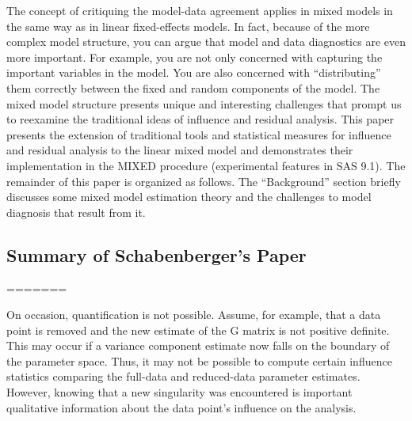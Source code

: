 \documentclass[12pt, a4paper]{article}
\begin{document}
The concept of critiquing the model-data agreement applies in mixed models in the same way as in linear
fixed-effects models. In fact, because of the more complex model structure, you can argue that model and
data diagnostics are even more important. For example, you are not only concerned with capturing the
important variables in the model. You are also concerned with “distributing” them correctly between the
fixed and random components of the model. The mixed model structure presents unique and interesting
challenges that prompt us to reexamine the traditional ideas of influence and residual analysis.
This paper presents the extension of traditional tools and statistical measures for influence and residual
analysis to the linear mixed model and demonstrates their implementation in the MIXED procedure (experimental
features in SAS 9.1). The remainder of this paper is organized as follows. The “Background” section
briefly discusses some mixed model estimation theory and the challenges to model diagnosis that result
from it.

%	
%	
\subsection{Summary of Schabenberger's Paper}
=======
\newpage

On occasion, quantification is not possible. Assume, for example, that a data point is removed
and the new estimate of the G matrix is not positive definite. This may occur if a variance component
estimate now falls on the boundary of the parameter space. Thus, it may not be possible to compute certain
influence statistics comparing the full-data and reduced-data parameter estimates. However, knowing that
a new singularity was encountered is important qualitative information about the data point’s influence on
the analysis.
\end{document}
